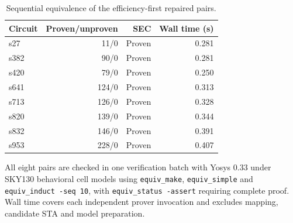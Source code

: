 \begin{table}[htbp]\centering\small
\caption{Sequential equivalence of the efficiency-first repaired pairs.}\label{tab:sec_iscas8}
\begin{tabular}{lrrr}\toprule
Circuit & Proven/unproven & SEC & Wall time (s)\\\midrule
s27 & 11/0 & Proven & 0.281\\
s382 & 90/0 & Proven & 0.281\\
s420 & 79/0 & Proven & 0.250\\
s641 & 124/0 & Proven & 0.313\\
s713 & 126/0 & Proven & 0.328\\
s820 & 139/0 & Proven & 0.344\\
s832 & 146/0 & Proven & 0.391\\
s953 & 228/0 & Proven & 0.407\\
\bottomrule
\end{tabular}
\par\smallskip\footnotesize All eight pairs are checked in one verification batch with Yosys 0.33 under SKY130 behavioral cell models using \texttt{equiv\_make}, \texttt{equiv\_simple} and \texttt{equiv\_induct -seq 10}, with \texttt{equiv\_status -assert} requiring complete proof. Wall time covers each independent prover invocation and excludes mapping, candidate STA and model preparation.
\end{table}